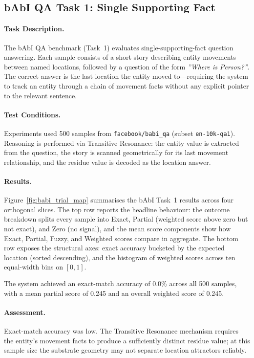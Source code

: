 \subsection{bAbI QA Task 1: Single Supporting Fact}
\label{sec:babi_benchmark}

\paragraph{Task Description.}
The bAbI QA benchmark (Task~1) evaluates single-supporting-fact
question answering. Each sample consists of a short story describing
entity movements between named locations, followed by a question of
the form \textit{''Where is Person?''}. The correct answer is the
last location the entity moved to---requiring the system to track
an entity through a chain of movement facts without any explicit
pointer to the relevant sentence.

\paragraph{Test Conditions.}
Experiments used 500 samples from
\texttt{facebook/babi\_qa} (subset \texttt{en-10k-qa1}).
Reasoning is performed via Transitive Resonance: the entity value is
extracted from the question, the story is scanned geometrically for
its last movement relationship, and the residue value is decoded as
the location answer.

\paragraph{Results.}
Figure~\ref{fig:babi_trial_map} summarises the bAbI Task~1 results
across four orthogonal slices. The top row reports the headline
behaviour: the outcome breakdown splits every sample into Exact,
Partial (weighted score above zero but not exact), and Zero
(no signal), and the mean score components show how Exact,
Partial, Fuzzy, and Weighted scores compare in aggregate. The
bottom row exposes the structural axes: exact accuracy bucketed by
the expected location (sorted descending), and the histogram of
weighted scores across ten equal-width bins on $[0,1]$.

The system achieved an exact-match accuracy of 0.0\%
across all 500 samples, with a mean partial score of
0.245 and an overall weighted score of
0.245.

\paragraph{Assessment.}
Exact-match accuracy was low.  The Transitive Resonance mechanism
requires the entity's movement facts to produce a sufficiently
distinct residue value; at this sample size the substrate geometry
may not separate location attractors reliably.

